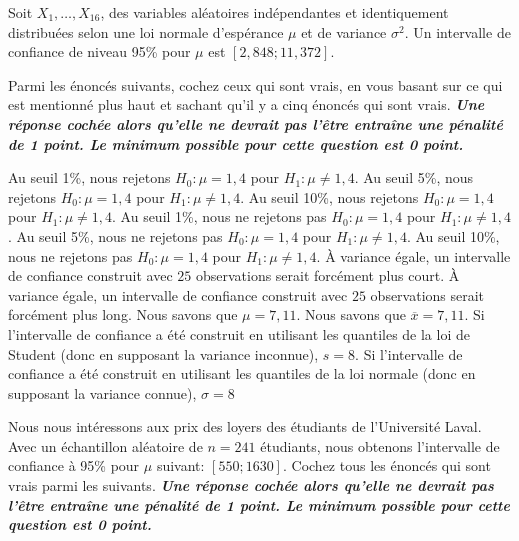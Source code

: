 \mbox{}

\begin{questions}
\question[5]\label{QCMicTests}
Soit $X_1,\hdots,X_{16}$, des variables aléatoires indépendantes et identiquement distribuées selon une loi normale d'espérance $\mu$ et de variance $\sigma^2$. Un intervalle de confiance de niveau 95\% pour $\mu$ est $[2,848 ; 11,372]$.

\medskip

Parmi les énoncés suivants, cochez ceux qui sont vrais, en vous basant sur ce qui est mentionné plus haut et sachant qu'il y a cinq énoncés qui sont vrais. \textit{\textbf{Une réponse cochée alors qu'elle ne devrait pas l'être entraîne une pénalité de 1 point. Le minimum possible pour cette question est 0 point.}}
    

\medskip
    \begin{checkboxes}
        \choice Au seuil 1\%, nous rejetons $H_0: \mu=1,4$ pour $H_1:\mu \neq 1,4$.
        \CorrectChoice Au seuil 5\%, nous rejetons $H_0: \mu=1,4$ pour $H_1:\mu \neq 1,4$.
        \correctchoice Au seuil 10\%, nous rejetons $H_0: \mu=1,4$ pour $H_1:\mu \neq 1,4$.
        \choice Au seuil 1\%, nous ne rejetons pas $H_0: \mu=1,4$ pour $H_1:\mu \neq 1,4$.
        \choice Au seuil 5\%, nous ne rejetons pas $H_0: \mu=1,4$ pour $H_1:\mu \neq 1,4$.
        \choice Au seuil 10\%, nous ne rejetons pas $H_0: \mu=1,4$ pour $H_1:\mu \neq 1,4$.
        \correctchoice À variance égale, un intervalle de confiance construit avec $25$ observations serait forcément plus court.
        \choice À variance égale, un intervalle de confiance construit avec $25$ observations serait forcément plus long.
        \choice Nous savons que $\mu=7,11$.
        \correctchoice Nous savons que $\overline{x}=7,11$.
        \correctchoice Si l'intervalle de confiance a été construit en utilisant les quantiles de la loi de Student (donc en supposant la variance inconnue), $s=8$.
        \choice Si l'intervalle de confiance a été construit en utilisant les quantiles de la loi normale (donc en supposant la variance connue), $\sigma =8$
    \end{checkboxes}


\vspace{1cm}

\question [4] Nous nous intéressons aux prix des loyers des étudiants de l'Université Laval. 
Avec un échantillon aléatoire de $n=241$ étudiants, nous obtenons l'intervalle de confiance à 95\%  pour $\mu$ suivant: $[550;1630]$. 
Cochez tous les énoncés qui sont vrais parmi les suivants. \textit{\textbf{Une réponse cochée alors qu'elle ne devrait pas l'être entraîne une pénalité de 1 point. Le minimum possible pour cette question est 0 point.}}
 

\end{questions}
